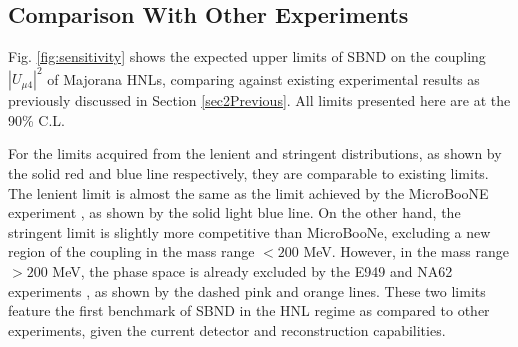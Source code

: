 \subsection{Comparison With Other Experiments}

Fig. \ref{fig:sensitivity} shows the expected upper limits of SBND on the coupling $|U_{\mu4}|^2$ of Majorana HNLs, comparing against existing experimental results as previously discussed in Section \ref{sec2Previous}.
All limits presented here are at the 90\% C.L.

For the limits acquired from the lenient and stringent distributions, as shown by the solid red and blue line respectively, they are comparable to existing limits.
The lenient limit is almost the same as the limit achieved by the MicroBooNE experiment \cite{uboone1, uboone2, uboone3}, as shown by the solid light blue line.
On the other hand, the stringent limit is slightly more competitive than MicroBooNe, excluding a new region of the coupling in the mass range $< 200$ MeV.
However, in the mass range $> 200$ MeV, the phase space is already excluded by the E949 \cite{E949} and NA62 experiments \cite{NA62A, NA62B}, as shown by the dashed pink and orange lines.
These two limits feature the first benchmark of SBND in the HNL regime as compared to other experiments, given the current detector and reconstruction capabilities.

